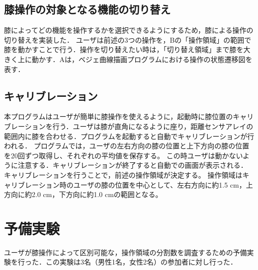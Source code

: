 \documentclass[submit, techrep]{ipsj}
\begin{document}
\subsection{膝操作の対象となる機能の切り替え}
膝によってどの機能を操作するかを選択できるようにするため，膝による操作の切り替えを実装した．
ユーザは前述の3つの操作を，Bの「操作領域」の範囲で膝を動かすことで行う．操作を切り替えたい時は，「切り替え領域」まで膝を大きく上に動かす．Aは，ベジェ曲線描画プログラムにおける操作の状態遷移図を表す．
\subsection{キャリブレーション}
本プログラムはユーザが簡単に膝操作を使えるように，起動時に膝位置のキャリブレーションを行う．ユーザは膝が直角になるように座り，距離センサアレイの範囲内に膝を合わせる．プログラムを起動すると自動でキャリブレーションが行われる．
プログラムでは，ユーザの左右方向の膝の位置と上下方向の膝の位置を20回ずつ取得し、それぞれの平均値を保存する。
この時ユーザは動かないように注意する．キャリブレーションが終了すると自動での画面が表示される．
キャリブレーションを行うことで，前述の操作領域が決定する。
操作領域はキャリブレーション時のユーザの膝の位置を中心として、左右方向に約1.5 \si{cm}，上方向に約2.0 \si{cm}，下方向に約1.0 \si{cm}の範囲となる。



\section{予備実験}
ユーザが膝操作によって区別可能な，操作領域の分割数を調査するための予備実験を行った．この実験は3名（男性1名，女性2名）の参加者に対し行った．
\end{document}
